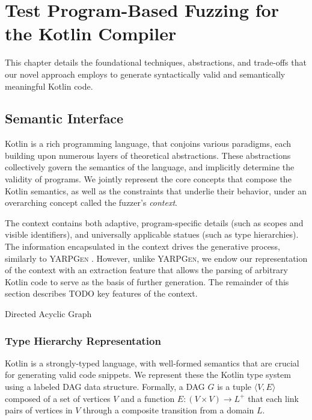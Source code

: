 \chapter{\label{cha:algorithm} Test Program-Based Fuzzing for the Kotlin Compiler}

This chapter details the foundational techniques, abstractions,
and trade-offs that our novel approach employs to generate syntactically
valid and semantically meaningful Kotlin code.

\section{\label{sec:context}Semantic Interface}

Kotlin is a rich programming language, that conjoins various
paradigms, each building upon numerous layers of
theoretical abstractions.
These abstractions collectively govern the semantics
of the language, and implicitly determine the validity of programs.
We jointly represent the core concepts that compose the Kotlin
semantics, as well as the constraints that underlie their behavior,
under an overarching concept called the fuzzer's \textit{context}.

The context contains both adaptive, program-specific details (such as scopes and
visible identifiers), and universally applicable statues (such as type hierarchies).
The information encapsulated in the context drives the generative
process, similarly to \textsc{YARPGen} \cite{manes2019art}.
However, unlike \textsc{YARPGen}, we endow our representation of the context
with an extraction feature that allows the parsing of arbitrary
Kotlin code to serve as the basis of further generation. 
The remainder of this section describes TODO key features of the context.

 {Directed Acyclic Graph}

\subsection{\label{subsec:type-hierarchy}Type Hierarchy Representation}

Kotlin is a strongly-typed language, with well-formed semantics
that are crucial for generating valid code snippets.
We represent these the Kotlin type system using a labeled \Gls{DAG} data structure.
Formally, a \Gls{DAG} $G$ is a tuple $\langle V, E \rangle$ composed
of a set of vertices $V$ and a function $E : (V \times V) \to L^{+}$ that
each link pairs of vertices in $V$ through a composite transition from a domain $L$.

